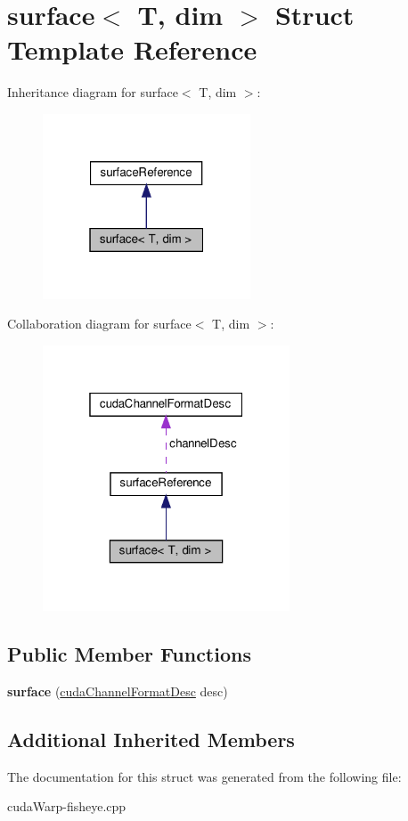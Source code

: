 \hypertarget{structsurface}{}\section{surface$<$ T, dim $>$ Struct Template Reference}
\label{structsurface}


Inheritance diagram for surface$<$ T, dim $>$\+:\nopagebreak
\begin{figure}[H]
\begin{center}
\leavevmode
\includegraphics[width=175pt]{structsurface__inherit__graph}
\end{center}
\end{figure}


Collaboration diagram for surface$<$ T, dim $>$\+:\nopagebreak
\begin{figure}[H]
\begin{center}
\leavevmode
\includegraphics[width=208pt]{structsurface__coll__graph}
\end{center}
\end{figure}
\subsection*{Public Member Functions}
\begin{DoxyCompactItemize}
\item 
{\bfseries surface} (\hyperlink{structcudaChannelFormatDesc}{cuda\+Channel\+Format\+Desc} desc)\hypertarget{structsurface_ae602ff569957fc111463cc4d7049db21}{}\label{structsurface_ae602ff569957fc111463cc4d7049db21}

\end{DoxyCompactItemize}
\subsection*{Additional Inherited Members}


The documentation for this struct was generated from the following file\+:\begin{DoxyCompactItemize}
\item 
cuda\+Warp-\/fisheye.\+cpp\end{DoxyCompactItemize}
